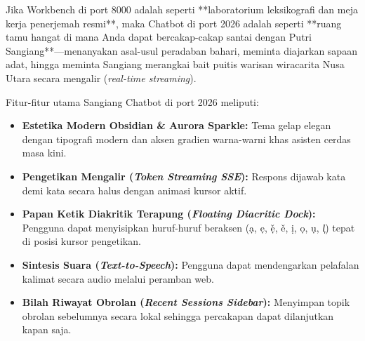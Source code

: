 \begin{infobox}
Jika Workbench di port 8000 adalah seperti **laboratorium leksikografi dan meja kerja penerjemah resmi**, maka Chatbot di port 2026 adalah seperti **ruang tamu hangat di mana Anda dapat bercakap-cakap santai dengan Putri Sangiang**---menanyakan asal-usul peradaban bahari, meminta diajarkan sapaan adat, hingga meminta Sangiang merangkai bait puitis warisan wiracarita Nusa Utara secara mengalir (\textit{real-time streaming}).
\end{infobox}

Fitur-fitur utama Sangiang Chatbot di port 2026 meliputi:
\begin{itemize}
    \item \textbf{Estetika Modern Obsidian \& Aurora Sparkle:} Tema gelap elegan dengan tipografi modern dan aksen gradien warna-warni khas asisten cerdas masa kini.
    \item \textbf{Pengetikan Mengalir (\textit{Token Streaming SSE}):} Respons dijawab kata demi kata secara halus dengan animasi kursor aktif.
    \item \textbf{Papan Ketik Diakritik Terapung (\textit{Floating Diacritic Dock}):} Pengguna dapat menyisipkan huruf-huruf beraksen (\d{a}, \d{e}, \v{\d{e}}, \v{e}, \d{i}, \d{o}, \d{u}, \textit{l᷊}) tepat di posisi kursor pengetikan.
    \item \textbf{Sintesis Suara (\textit{Text-to-Speech}):} Pengguna dapat mendengarkan pelafalan kalimat secara audio melalui peramban web.
    \item \textbf{Bilah Riwayat Obrolan (\textit{Recent Sessions Sidebar}):} Menyimpan topik obrolan sebelumnya secara lokal sehingga percakapan dapat dilanjutkan kapan saja.
\end{itemize}

